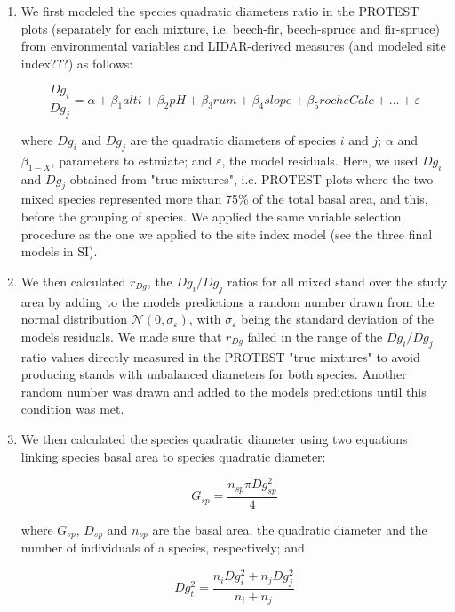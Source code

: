 \documentclass[a4paper]{article}
\begin{document}
\begin{enumerate}

  \item We first modeled the species quadratic diameters ratio in the PROTEST plots (separately for each mixture, i.e. beech-fir, beech-spruce and fir-spruce) from environmental variables and LIDAR-derived measures (and modeled site index???) as follows:

  \begin{equation}\label{DgModel}
    \frac{Dg_i}{Dg_j} = \alpha + \beta_1 alti + \beta_2 pH +\beta_3 rum +\beta_4 slope +\beta_5 rocheCalc+...+\varepsilon
  \end{equation}

  where $Dg_i$ and $Dg_j$ are the quadratic diameters of species $i$ and $j$; $\alpha$ and $\beta_{1-X}$, parameters to estmiate; and $\varepsilon$, the model residuals. Here, we used $Dg_i$ and $Dg_j$ obtained from "true mixtures", i.e. PROTEST plots where the two mixed species represented more than 75\% of the total basal area, and this, before the grouping of species. We applied the same variable selection procedure as the one we applied to the site index model (see the three final models in SI).

  \item We then calculated $r_{Dg}$, the $Dg_i / Dg_j$ ratios for all mixed stand over the study area by adding to the models predictions a random number drawn from the normal distribution $\mathcal{N} (0, \sigma_\varepsilon)$, with $\sigma_\varepsilon$ being the standard deviation of the models residuals. We made sure that $r_{Dg}$ falled in the range of the $Dg_i / Dg_j$ ratio values directly measured in the PROTEST "true mixtures" to avoid producing stands with unbalanced diameters for both species. Another random number was drawn and added to the models predictions until this condition was met.

  \item We then calculated the species quadratic diameter using two equations linking species basal area to species quadratic diameter:

  \begin{equation}\label{}
    G_{sp} = \frac{n_{sp}\pi Dg_{sp}^2}{4}
  \end{equation}

  where $G_{sp}$, $D_{sp}$ and $n_{sp}$ are the basal area, the quadratic diameter and the number of individuals of a species, respectively; and

  \begin{equation}\label{}
    Dg_t^2 = \frac{n_iDg_i^2 + n_jDg_j^2}{n_i + n_j}
  \end{equation}


\end{enumerate}
\end{document}
